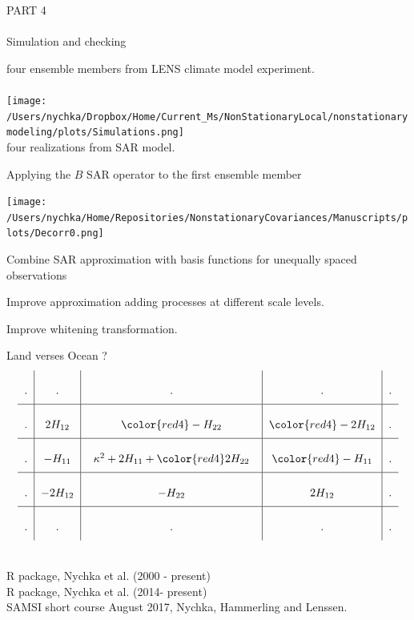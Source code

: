 \documentclass[bgimage]{/Users/nychka/Dropbox/Home/Tex/pfuef/pfuef}
\def\Mycomment#1{{\color{midnightblue}{\it  {\large #1}}}}
\def\Myheading#1{{\color{black}{\it  \bf {\large  #1}}}}
\begin{document}
{\slide{}
{\huge PART 4 \\ \\
Simulation and checking
}
\\


\Mycomment{Top}  four ensemble members from  LENS climate model experiment. \\
\\
\texttt{[image: /Users/nychka/Dropbox/Home/Current\_Ms/NonStationaryLocal/nonstationarymodeling/plots/Simulations.png]}
\\
\Mycomment{Bottom}  four realizations from SAR model. 

Applying the $B$ SAR operator to the first ensemble member

\texttt{[image: /Users/nychka/Home/Repositories/NonstationaryCovariances/Manuscripts/plots/Decorr0.png]}

\bdot Combine SAR approximation with basis functions for unequally spaced observations

\bdot Improve approximation adding  processes at different scale levels. 

\bdot Improve whitening transformation. 

\bdot Land verses Ocean ?
{\tiny
\[
     \arraycolsep=6.0pt\def\arraystretch{2.5}
   \begin{array}{c|c|c|c|c}
   .&.&.&.&.\\ \hline
      .&2H_{12} & {\color{red4} -H_{22}} &  {\color{red4} -{2H_{12}}}&. \\
        \hline
     .&-H_{11} & \;\; \kappa^2 + 2H_{11}+  {\color{red4} 2H_{22} }\;\; &  {\color{red4} - H_{11}}&. \\
      \hline
     .&-2H_{12} & - H_{22}& 2H_{12} &.\\
     \hline
      .&.&.&.&. 
    \end{array} 
\]
}

\slide{}
\Myheading{Software} \\
 R package, Nychka et al. (2000 - present)\\
 R package, Nychka et al. (2014- present) \\
  SAMSI short course August 2017, Nychka, Hammerling and Lenssen.\\

}
\end{document}
